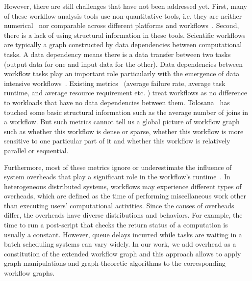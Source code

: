 However, there are still challenges that have not been addressed yet. First, many of these workflow analysis tools use non-quantitative tools, i.e. they are neither numerical~\cite{Yildiz2009,Garijo2013} nor comparable across different platforms and workflows~\cite{Juve2013,Callaghan2011}.
Second, there is a lack of using structural information in these tools. Scientific workflows are typically a graph constructed by data dependencies between computational tasks.  A data dependency means there is a data transfer between two tasks (output data for one and input data for the other). Data dependencies between workflow tasks play an important role particularly with the emergence of data intensive workflows~\cite{Callaghan2011}. Existing metrics~\cite{Juve2013, Callaghan2011, Bharathi2008}  (average failure rate, average task runtime, and average resource requirement etc. ) treat workflows as no difference to workloads that have no data dependencies between them. Tolosana~\cite{Tolosana2011} has touched some basic structural information such as the average number of joins in a workflow. But such metrics cannot tell us a global picture of workflow graph such as whether this workflow is dense or sparse, whether this workflow is more sensitive to one particular part of it and whether this workflow is relatively parallel or sequential. 

Furthermore, most of these metrics ignore or underestimate the influence of system overheads that play a significant role in the workflow's runtime~\cite{Chen2011, Prodan2008, Ostberg2011}. In heterogeneous distributed systems, workflows may experience different types of overheads, which are defined as the time of performing miscellaneous work other than executing users’ computational activities. Since the causes of overheads differ, the overheads have diverse distributions and behaviors. For example, the time to run a post-script that checks the return status of a computation is usually a constant. However, queue delays incurred while tasks are waiting in a batch scheduling systems can vary widely. In our work, we add overhead as a constitution of the extended workflow graph and this approach allows to apply graph manipulations and graph-theoretic algorithms to the corresponding workflow graphs. 

